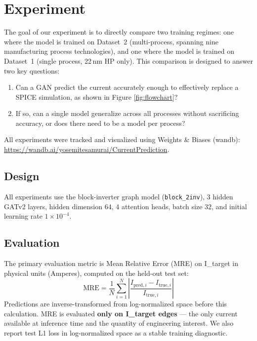 \documentclass[10pt,twocolumn,letterpaper]{article}
\begin{document}
\section{Experiment}
\label{sec:experiment}

The goal of our experiment is to directly compare two training regimes: one where the model is trained on Dataset~2 (multi-process, spanning nine manufacturing process technologies), and one where the model is trained on Dataset~1 (single process, 22\,nm HP only). This comparison is designed to answer two key questions:

\begin{enumerate}
    \item Can a GAN predict the current accurately enough to effectively replace a SPICE simulation, as shown in Figure \ref{fig:flowchart}?
    \item If so, can a single model generalize across all processes without sacrificing accuracy, or does there need to be a model per process?
\end{enumerate}

All experiments were tracked and visualized using Weights \& Biases (wandb): \url{https://wandb.ai/yosemitesamurai/CurrentPrediction}.

\subsection{Design}
\label{subsec:design}

All experiments use the block-inverter graph model (\texttt{block\_2inv}), 3 hidden GATv2 layers, hidden dimension 64, 4 attention heads, batch size 32, and initial learning rate $1\times10^{-4}$.

\subsection{Evaluation}
\label{subsec:evaluation}

The primary evaluation metric is Mean Relative Error (MRE) on I\_target in physical units (Amperes), computed on the held-out test set:
\begin{equation}
  \mathrm{MRE} = \frac{1}{N} \sum_{i=1}^{N} \left| \frac{I_{\mathrm{pred},i} - I_{\mathrm{true},i}}{I_{\mathrm{true},i}} \right|
\end{equation}
Predictions are inverse-transformed from log-normalized space before this calculation. MRE is evaluated \textbf{only on I\_target edges} — the only current available at inference time and the quantity of engineering interest. We also report test L1 loss in log-normalized space as a stable training diagnostic.
\end{document}
